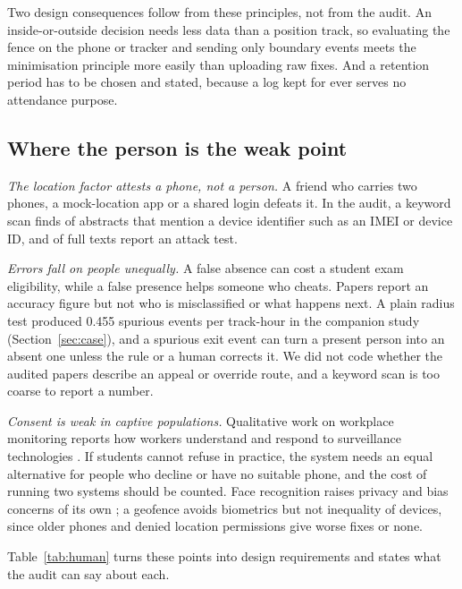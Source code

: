 \documentclass[preprint,12pt]{elsarticle}
\begin{document}
Two design consequences follow from these principles, not from the audit. An inside-or-outside decision needs less data than a position track, so evaluating the fence on the phone or tracker and sending only boundary events meets the minimisation principle more easily than uploading raw fixes. And a retention period has to be chosen and stated, because a log kept for ever serves no attendance purpose.

\subsection{Where the person is the weak point}
\emph{The location factor attests a phone, not a person.} A friend who carries two phones, a mock-location app or a shared login defeats it. In the audit, a keyword scan finds \hfDevBind{} of \hfN{} abstracts that mention a device identifier such as an IMEI or device ID, and \ftQthree{} of \ftN{} full texts report an attack test.

\emph{Errors fall on people unequally.} A false absence can cost a student exam eligibility, while a false presence helps someone who cheats. Papers report an accuracy figure but not who is misclassified or what happens next. A plain radius test produced 0.455 spurious events per track-hour in the companion study (Section~\ref{sec:case}), and a spurious exit event can turn a present person into an absent one unless the rule or a human corrects it. We did not code whether the audited papers describe an appeal or override route, and a keyword scan is too coarse to report a number.

\emph{Consent is weak in captive populations.} Qualitative work on workplace monitoring reports how workers understand and respond to surveillance technologies \cite{@332}. If students cannot refuse in practice, the system needs an equal alternative for people who decline or have no suitable phone, and the cost of running two systems should be counted. Face recognition raises privacy and bias concerns of its own \cite{@21,@645}; a geofence avoids biometrics but not inequality of devices, since older phones and denied location permissions give worse fixes or none.

Table~\ref{tab:human} turns these points into design requirements and states what the audit can say about each.
\end{document}
